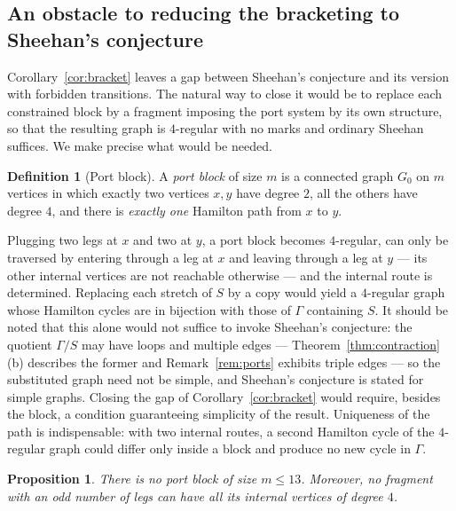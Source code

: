 \documentclass[11pt,a4paper]{article}
\newtheorem{proposition}[theorem]{Proposition}
\theoremstyle{definition}
\newtheorem{definition}[theorem]{Definition}
\theoremstyle{remark}
\begin{document}
\subsection{An obstacle to reducing the bracketing to Sheehan's conjecture}

Corollary~\ref{cor:bracket} leaves a gap between Sheehan's conjecture and its version with forbidden transitions. The natural way to close it would be to replace each constrained block by a fragment imposing the port system by its own structure, so that the resulting graph is $4$-regular with no marks and ordinary Sheehan suffices. We make precise what would be needed.

\begin{definition}[Port block]\label{def:gadget}
A \emph{port block} of size $m$ is a connected graph $G_0$ on $m$ vertices in which exactly two vertices $x,y$ have degree $2$, all the others have degree $4$, and there is \emph{exactly one} Hamilton path from $x$ to $y$.
\end{definition}

Plugging two legs at $x$ and two at $y$, a port block becomes $4$-regular, can only be traversed by entering through a leg at $x$ and leaving through a leg at $y$ --- its other internal vertices are not reachable otherwise --- and the internal route is determined. Replacing each stretch of $S$ by a copy would yield a $4$-regular graph whose Hamilton cycles are in bijection with those of $\Gamma$ containing $S$. It should be noted that this alone would not suffice to invoke Sheehan's conjecture: the quotient $\Gamma/S$ may have loops and multiple edges --- Theorem~\ref{thm:contraction}(b) describes the former and Remark~\ref{rem:ports} exhibits triple edges --- so the substituted graph need not be simple, and Sheehan's conjecture is stated for simple graphs. Closing the gap of Corollary~\ref{cor:bracket} would require, besides the block, a condition guaranteeing simplicity of the result. Uniqueness of the path is indispensable: with two internal routes, a second Hamilton cycle of the $4$-regular graph could differ only inside a block and produce no new cycle in $\Gamma$.

\begin{proposition}\label{prop:nogadget}
There is no port block of size $m\le13$. Moreover, no fragment with an odd number of legs can have all its internal vertices of degree $4$.
\end{proposition}
\end{document}
